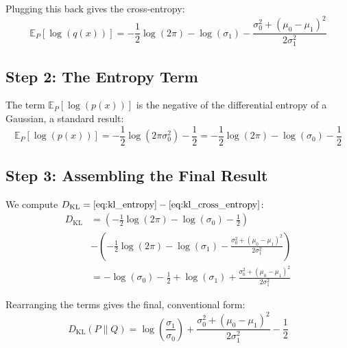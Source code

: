 Plugging this back gives the cross-entropy:
\begin{equation}
    \mathbb{E}_{P}\left[ \log(q(x)) \right] = -\frac{1}{2}\log(2\pi) - \log(\sigma_1) - \frac{\sigma_0^2 + (\mu_0-\mu_1)^2}{2\sigma_1^2}
    \label{eq:kl_cross_entropy}
\end{equation}

\subsection{Step 2: The Entropy Term}

The term $\mathbb{E}_{P}\left[ \log(p(x)) \right]$ is the negative of the differential entropy of a Gaussian, a standard result:
\begin{equation}
    \mathbb{E}_{P}\left[ \log(p(x)) \right] = -\frac{1}{2}\log(2\pi\sigma_0^2) - \frac{1}{2} = -\frac{1}{2}\log(2\pi) - \log(\sigma_0) - \frac{1}{2}
    \label{eq:kl_entropy}
\end{equation}

\subsection{Step 3: Assembling the Final Result}

We compute $D_{\text{KL}} = \eqref{eq:kl_entropy} - \eqref{eq:kl_cross_entropy}$:
\begin{align*}
    D_{\text{KL}} &= \left( -\frac{1}{2}\log(2\pi) - \log(\sigma_0) - \frac{1}{2} \right) \\
    & - \left( -\frac{1}{2}\log(2\pi) - \log(\sigma_1) - \frac{\sigma_0^2 + (\mu_0-\mu_1)^2}{2\sigma_1^2} \right) \\
    &= - \log(\sigma_0) - \frac{1}{2} + \log(\sigma_1) + \frac{\sigma_0^2 + (\mu_0-\mu_1)^2}{2\sigma_1^2}
\end{align*}

Rearranging the terms gives the final, conventional form:
\begin{equation}
    D_{\text{KL}}(P \parallel Q) = \log\left(\frac{\sigma_1}{\sigma_0}\right) + \frac{\sigma_0^2 + (\mu_0-\mu_1)^2}{2\sigma_1^2} - \frac{1}{2}
    \label{eq:kl_final}
\end{equation}